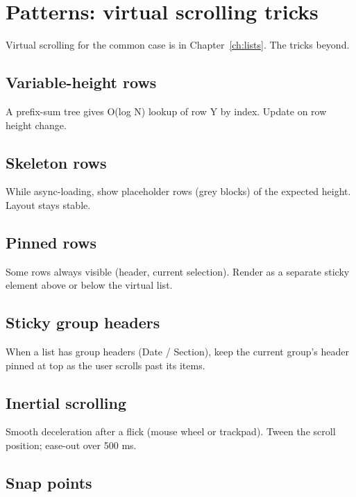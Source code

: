\chapter{Patterns: virtual scrolling tricks}
\label{ch:vscroll}

\begin{aside}
Virtual scrolling for the common case is in
Chapter~\ref{ch:lists}. The tricks beyond.
\end{aside}

\section{Variable-height rows}

A prefix-sum tree gives O(log N) lookup of row Y by
index. Update on row height change.

\section{Skeleton rows}

While async-loading, show placeholder rows (grey blocks)
of the expected height. Layout stays stable.

\section{Pinned rows}

Some rows always visible (header, current selection).
Render as a separate sticky element above or below the
virtual list.

\section{Sticky group headers}

When a list has group headers (Date / Section), keep the
current group's header pinned at top as the user scrolls
past its items.

\section{Inertial scrolling}

Smooth deceleration after a flick (mouse wheel or
trackpad). Tween the scroll position; ease-out over
500 ms.

\section{Snap points}

